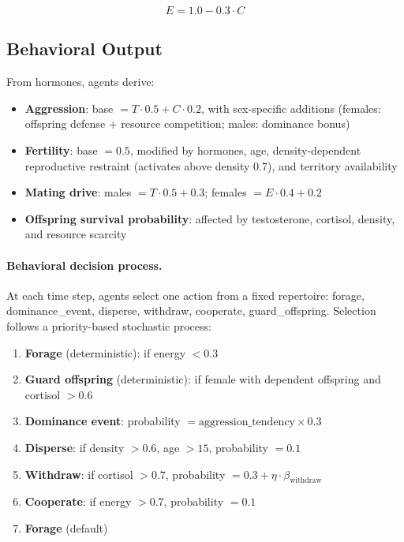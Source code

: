 \begin{equation}
E = 1.0 - 0.3 \cdot C
\label{eq:estrogen}
\end{equation}

\subsection{Behavioral Output}
\label{sec:behavior}

From hormones, agents derive:

\begin{itemize}
\item \textbf{Aggression}: base $= T \cdot 0.5 + C \cdot 0.2$, with sex-specific additions (females: offspring defense + resource competition; males: dominance bonus)
\item \textbf{Fertility}: base $= 0.5$, modified by hormones, age, density-dependent reproductive restraint (activates above density 0.7), and territory availability
\item \textbf{Mating drive}: males $= T \cdot 0.5 + 0.3$; females $= E \cdot 0.4 + 0.2$
\item \textbf{Offspring survival probability}: affected by testosterone, cortisol, density, and resource scarcity
\end{itemize}

\paragraph{Behavioral decision process.}
At each time step, agents select one action from a fixed repertoire: forage, dominance\_event, disperse, withdraw, cooperate, guard\_offspring. Selection follows a priority-based stochastic process:

\begin{enumerate}
\item \textbf{Forage} (deterministic): if energy $< 0.3$
\item \textbf{Guard offspring} (deterministic): if female with dependent offspring and cortisol $> 0.6$
\item \textbf{Dominance event}: probability $= \text{aggression\_tendency} \times 0.3$
\item \textbf{Disperse}: if density $> 0.6$, age $> 15$, probability $= 0.1$
\item \textbf{Withdraw}: if cortisol $> 0.7$, probability $= 0.3 + \eta \cdot \beta_{\text{withdraw}}$
\item \textbf{Cooperate}: if energy $> 0.7$, probability $= 0.1$
\item \textbf{Forage} (default)
\end{enumerate}

